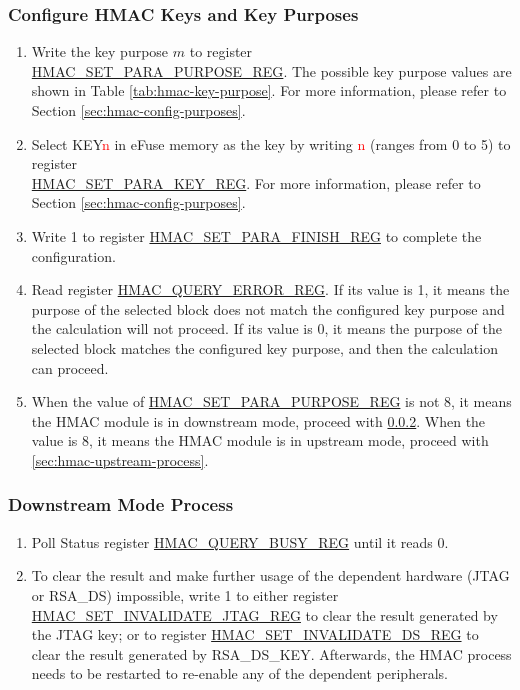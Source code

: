 \documentclass[main\_\_EN.tex]{subfiles}
\begin{document}
\subsubsection{Configure HMAC Keys and Key Purposes}
    \begin{enumerate}
        \item Write the key purpose \begin{math}m\end{math} to register \hyperref[regdesc:HMACSETPARAPURPOSEREG]{HMAC\_SET\_PARA\_PURPOSE\_REG}. The possible key purpose values are shown in Table \ref{tab:hmac-key-purpose}. For more information, please refer to Section \ref{sec:hmac-config-purposes}.
        \item Select KEY\textcolor{red}{n} in eFuse memory as the key by writing \textcolor{red}{n} (ranges from 0 to 5) to register\\ \hyperref[regdesc:HMACSETPARAKEYREG]{HMAC\_SET\_PARA\_KEY\_REG}. For more information, please refer to Section \ref{sec:hmac-config-purposes}.
        \item Write 1 to register \hyperref[regdesc:HMACSETPARAFINISHREG]{HMAC\_SET\_PARA\_FINISH\_REG} to complete the configuration.
        \item Read register \hyperref[regdesc:HMACQUERYERRORREG]{HMAC\_QUERY\_ERROR\_REG}. If its value is 1, it means the purpose of the selected block does not match the configured key purpose and the calculation will not proceed. If its value is 0, it means the purpose of the selected block matches the configured key purpose, and then the calculation can proceed.
        \item When the value of \hyperref[regdesc:HMACSETPARAPURPOSEREG]{HMAC\_SET\_PARA\_PURPOSE\_REG} is not 8, it means the HMAC module is in downstream mode, proceed with \ref{sec:hmac-downstream-process}. When the value is 8, it means the HMAC module is in upstream mode, proceed with \ref{sec:hmac-upstream-process}.
    \end{enumerate}

\subsubsection{Downstream Mode Process}
\label{sec:hmac-downstream-process}
    \begin{enumerate}
        \item Poll Status register \hyperref[regdesc:HMACQUERYBUSYREG]{HMAC\_QUERY\_BUSY\_REG} until it reads 0.
        \item
        To clear the result and make further usage of the dependent hardware (JTAG or RSA\_DS) impossible, write 1 to either register \hyperref[regdesc:HMACSETINVALIDATEJTAGREG]{HMAC\_SET\_INVALIDATE\_JTAG\_REG} to clear the result generated by the JTAG key; or to register \hyperref[regdesc:HMACSETINVALIDATEDSREG]{HMAC\_SET\_INVALIDATE\_DS\_REG} to clear the result generated by RSA\_DS\_KEY. Afterwards, the HMAC process needs to be restarted to re-enable any of the dependent peripherals.
    \end{enumerate}
\end{document}
